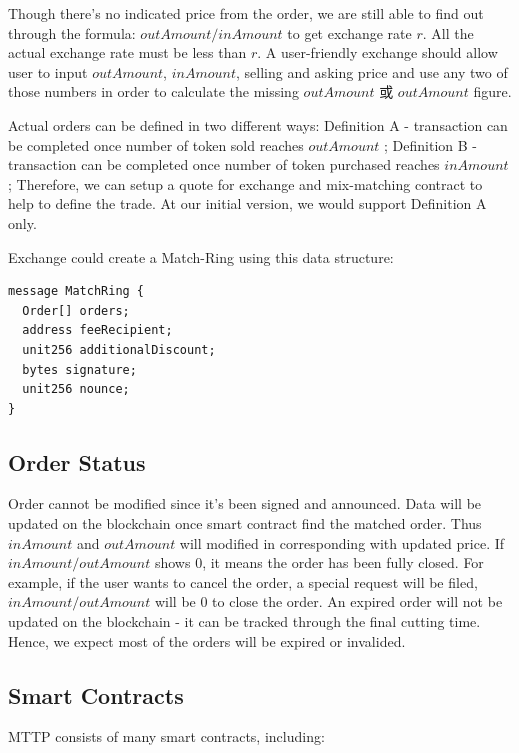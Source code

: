 \documentclass[UTF8,nofonts]{article}
\begin{document}
Though there's no indicated price from the order, we are still able to find out through the formula: $outAmount / inAmount$ to get exchange rate $r$. All the actual exchange rate must be less than $r$. A user-friendly exchange should allow user to input $outAmount$, $inAmount$,  selling and asking price and use any two of those numbers in order to calculate the missing $outAmount$ 或 $outAmount$ figure.

Actual orders can be defined in two different ways: Definition A - transaction can be completed once number of token sold reaches $outAmount$ ; Definition B - transaction can be completed once number of token purchased reaches $inAmount$; Therefore,  we can setup a quote for exchange and mix-matching contract to help to define the trade. At our initial version,  we would support Definition A only.

Exchange could create a Match-Ring using this data structure:
\begin{verbatim}
message MatchRing {
  Order[] orders;
  address feeRecipient;
  unit256 additionalDiscount;
  bytes signature;
  unit256 nounce;
}
\end{verbatim}


\subsection{Order Status\label{sec: orderstate}}


Order cannot be modified since it's been signed and announced. Data will be updated on the blockchain once smart contract find the matched order. Thus $inAmount$ and $outAmount$ will modified in corresponding with updated price. If $inAmount / outAmount$ shows 0,  it means the order has been fully closed. For example,  if the user wants to cancel the order,  a special request will be filed,  $inAmount / outAmount$ will be 0 to close the order. An expired order will not be updated on the blockchain - it can be tracked through the final cutting time. Hence,  we expect most of the orders will be expired or invalided.

\subsection{Smart Contracts\label{sec: contracts}}

MTTP consists of many smart contracts,  including:
\end{document}
